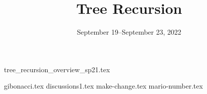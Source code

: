 \documentclass{exam}
\title{Tree Recursion}
\date{September 19--September 23, 2022}
\begin{document}
\maketitle

{tree_recursion_overview_sp21.tex}

\begin{questions}
{gibonacci.tex}
{discussions1.tex}
{make-change.tex}
{mario-number.tex}


\end{questions}
\end{document}
